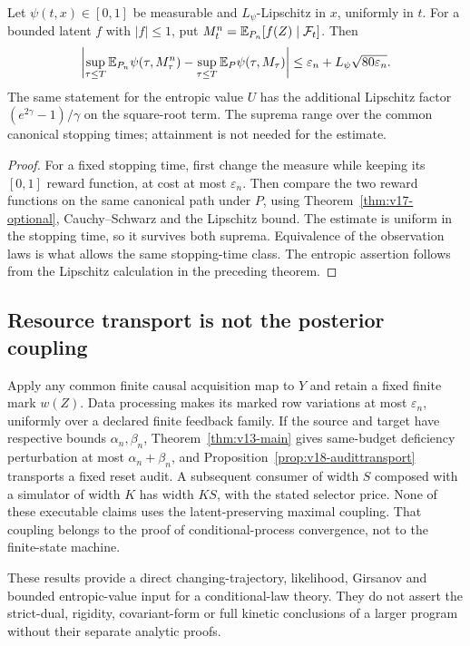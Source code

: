 \begin{corollary}
\label{cor:v18-stopping}
Let $\psi(t,x)\in[0,1]$ be measurable and $L_\psi$-Lipschitz in $x$,
uniformly in $t$. For a bounded latent $f$ with $|f|\le1$, put
$M_t^n=\mathbb E_{P_n}[f(Z)\mid\mathcal F_t]$. Then
\[
 \left|\sup_{\tau\le T}\mathbb E_{P_n}\psi(\tau,M_\tau^n)
       -\sup_{\tau\le T}\mathbb E_P\psi(\tau,M_\tau)\right|
 \le\varepsilon_n+L_\psi\sqrt{80\varepsilon_n}.
\]
The same statement for the entropic value $U$ has the additional
Lipschitz factor $(e^{2\gamma}-1)/\gamma$ on the square-root term.
The suprema range over the common canonical stopping times; attainment
is not needed for the estimate.
\end{corollary}
\begin{proof}
For a fixed stopping time, first change the measure while keeping its
$[0,1]$ reward function, at cost at most $\varepsilon_n$. Then compare
the two reward functions on the same canonical path under $P$, using
Theorem~\ref{thm:v17-optional}, Cauchy--Schwarz and the Lipschitz bound.
The estimate is uniform in the stopping time, so it survives both
suprema. Equivalence of the observation laws is what allows the same
stopping-time class. The entropic assertion follows from the Lipschitz
calculation in the preceding theorem.
\end{proof}

\subsection{Resource transport is not the posterior coupling}
Apply any common finite causal acquisition map to $Y$ and retain a fixed
finite mark $w(Z)$. Data processing makes its marked row variations at
most $\varepsilon_n$, uniformly over a declared finite feedback family.
If the source and target have respective bounds $\alpha_n,\beta_n$,
Theorem~\ref{thm:v13-main} gives same-budget deficiency perturbation at
most $\alpha_n+\beta_n$, and
Proposition~\ref{prop:v18-audittransport} transports a fixed reset audit.
A subsequent consumer of width $S$ composed with a simulator of width $K$
has width $KS$, with the stated selector price. None of these executable
claims uses the latent-preserving maximal coupling. That coupling belongs
to the proof of conditional-process convergence, not to the finite-state
machine.

These results provide a direct changing-trajectory, likelihood,
Girsanov and bounded entropic-value input for a conditional-law theory.
They do not assert the strict-dual, rigidity, covariant-form or full kinetic
conclusions of a larger program without their separate analytic proofs.

